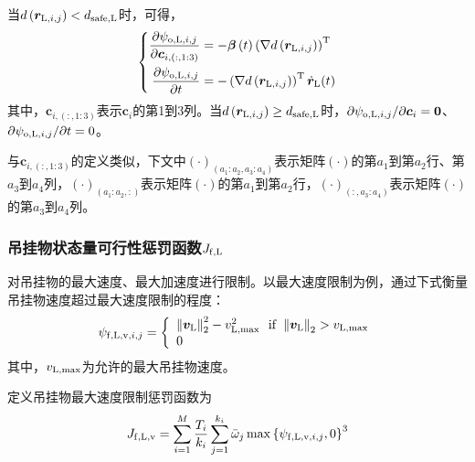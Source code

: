 当$d\left({\boldsymbol{r}}_{{\rm{L}},i,j}\right) < d_{\rm{safe, L}}$时，可得，
\begin{equation}\label{partial_psi_o_L_i_j}
    \left\{\begin{aligned}
        \frac{\partial \psi_{{\rm{o,L}},i,j}}{\partial \boldsymbol{c}_{i,(:,1:3)}} &= -\boldsymbol{\beta}\left(t\right)\left(\nabla d\left(\boldsymbol{r}_{{\rm{L}},i,j}\right)\right)^{\rm{T}}\\
        \frac{\partial \psi_{{\rm{o,L}},i,j}}{\partial t} &= -\left(\nabla d \left(\boldsymbol{r}_{{\rm{L}},i,j}\right)\right)^{\rm{T}}\dot{\boldsymbol{r}}_{\rm{L}}(t)
    \end{aligned}
    \right.
\end{equation}
其中，$\boldsymbol{c}_{i,(:,1:3)}$表示$\boldsymbol{c}_i$的第1到3列。当$d\left({\boldsymbol{r}}_{{\rm{L}},i,j}\right) \ge d_{\rm{safe, L}}$时，$\partial \psi_{{\rm{o,L}},i,j}/\partial \boldsymbol{c}_i = \boldsymbol{0}$、$\partial \psi_{{\rm{o,L}},i,j} / \partial t = 0$。

与$\boldsymbol{c}_{i,(:,1:3)}$的定义类似，下文中$\left(\cdot\right)_{\left(a_1:a_2,a_3:a_4\right)}$表示矩阵$\left(\cdot\right)$的第$a_1$到第$a_2$行、第$a_3$到$a_4$列，$\left(\cdot\right)_{\left(a_1:a_2,:\right)}$表示矩阵$\left(\cdot\right)$的第$a_1$到第$a_2$行，$\left(\cdot\right)_{\left(:,a_3:a_4\right)}$表示矩阵$\left(\cdot\right)$的第$a_3$到$a_4$列。

\subsubsection{吊挂物状态量可行性惩罚函数$J_{\rm{f,L}}$}
对吊挂物的最大速度、最大加速度进行限制。以最大速度限制为例，通过下式衡量吊挂物速度超过最大速度限制的程度：
\begin{equation}\label{psi_f_L_v_i_j}
    \psi_{{\rm{f,L,v}},i,j} = \left\{\begin{array}{l}
        \left\|\boldsymbol{v}_{\rm{L}}\right\|^2_2 - v_{{\rm{L,max}}}^2 \,\,\,\, {\rm{if}} \,\, \left\|\boldsymbol{v}_{\rm{L}}\right\|_2 > v_{\rm{L},\max}\\
        0
    \end{array}
    \right.
\end{equation}
其中，$v_{\rm{L,max}}$为允许的最大吊挂物速度。

定义吊挂物最大速度限制惩罚函数为
\begin{equation}\label{J_f_L_v}
    J_{\rm{f,L,v}} =\sum\limits_{i=1}^M\frac{T_i}{k_i}\sum\limits_{j=1}^{k_i}{\Bar{\omega}_j\max\left\{\psi_{{\rm{f,L,v}},i,j},0\right\}^3}
\end{equation}

